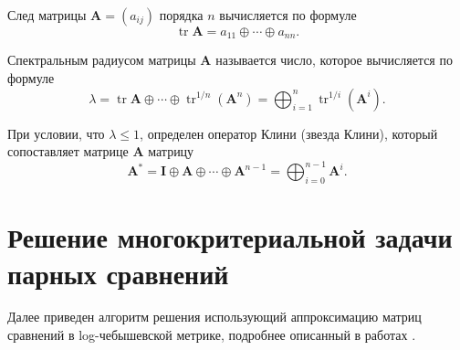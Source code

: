\documentclass[specialist, substylefile = spbureport.rtx,
    subf,href,colorlinks=true, 12pt]{disser}
\begin{document}
        След матрицы $\bm{A}=(a_{ij})$ порядка $n$ вычисляется по формуле 
        $$\mathop\mathrm{tr}\bm{A}=a_{11}\oplus\cdots\oplus a_{nn}.$$

        Спектральным радиусом матрицы $\bm{A}$ называется число, которое вычисляется по формуле
        \begin{equation*}
        \lambda
        =
        \mathop\mathrm{tr}\bm{A}\oplus\cdots\oplus\mathop\mathrm{tr}\nolimits^{1/n}(\bm{A}^{n})
        =
        \bigoplus_{i=1}^{n}{\mathop\mathrm{tr}}^{1/i}(\bm{A}^{i}).
        \end{equation*}

        При условии, что $\lambda\leq1$, определен оператор Клини (звезда Клини), который сопоставляет матрице $\bm{A}$ матрицу
        \begin{equation*}
        \bm{A}^{\ast}
        =
        \bm{I}\oplus\bm{A}\oplus\cdots\oplus\bm{A}^{n-1}
        =
        \bigoplus_{i=0}^{n-1}\bm{A}^{i}.
        \end{equation*}

    \chapter{Решение многокритериальной задачи парных сравнений}

    Далее приведен алгоритм решения использующий аппроксимацию матриц сравнений в log-чебышевской метрике, подробнее описанный в работах \cite{Krivulin2019Metody,Krivulin2019Tropical,Krivulin2022Using}. 
\end{document}
